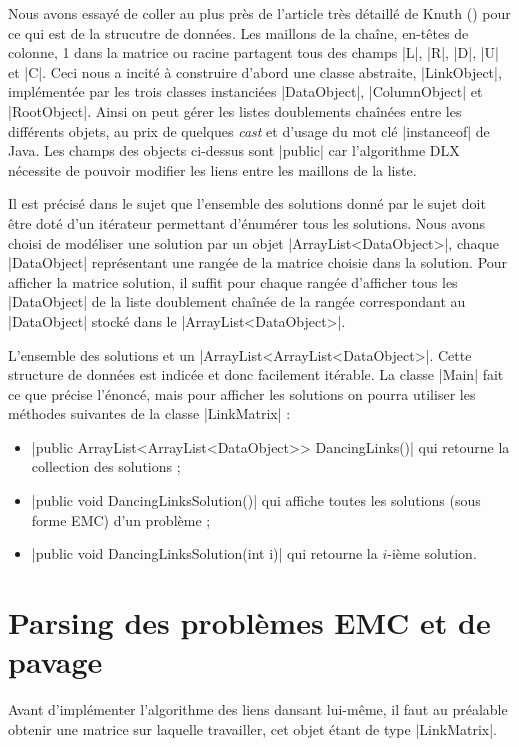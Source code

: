 \documentclass[11pt,french,a4paper]{article}
\begin{document}
Nous avons essayé de coller au plus près de l'article très détaillé de Knuth (\cite{Knuth}) pour ce qui est de la strucutre de données. Les maillons de la chaîne, en-têtes de colonne, 1 dans la matrice ou racine partagent tous des champs |L|, |R|, |D|, |U| et |C|. Ceci nous a incité à construire d'abord une classe abstraite, |LinkObject|, implémentée par les trois classes instanciées |DataObject|, |ColumnObject| et |RootObject|. Ainsi on peut gérer les listes doublements chaînées entre les différents objets, au prix de quelques \emph{cast} et d'usage du mot clé |instanceof| de Java. Les champs des objects ci-dessus sont |public| car l'algorithme DLX nécessite de pouvoir modifier les liens entre les maillons de la liste.

Il est précisé dans le sujet que l'ensemble des solutions donné par le sujet doit être doté d'un itérateur permettant d'énumérer tous les solutions. Nous avons choisi de modéliser une solution par un objet |ArrayList<DataObject>|, chaque |DataObject| représentant une rangée de la matrice choisie dans la solution. Pour afficher la matrice solution, il suffit pour chaque rangée d'afficher tous les |DataObject| de la liste doublement chaînée de la rangée correspondant au |DataObject| stocké dans le |ArrayList<DataObject>|.

L'ensemble des solutions et un |ArrayList<ArrayList<DataObject>|. Cette structure de données est indicée et donc facilement itérable. La classe |Main| fait ce que précise l'énoncé, mais pour afficher les solutions on pourra utiliser les méthodes suivantes de la classe |LinkMatrix| :
\begin{itemize}
	\item |public ArrayList<ArrayList<DataObject>> DancingLinks()| qui retourne la collection des solutions ;
	\item |public void DancingLinksSolution()| qui affiche toutes les solutions (sous forme EMC) d'un problème ;
	\item  |public void DancingLinksSolution(int i)| qui retourne la $i$-ième solution.
\end{itemize}



\section{Parsing des problèmes EMC et de pavage}

Avant d'implémenter l'algorithme des liens dansant lui-même, il faut au préalable obtenir une matrice sur laquelle travailler, cet objet étant de type |LinkMatrix|. 
\end{document}
